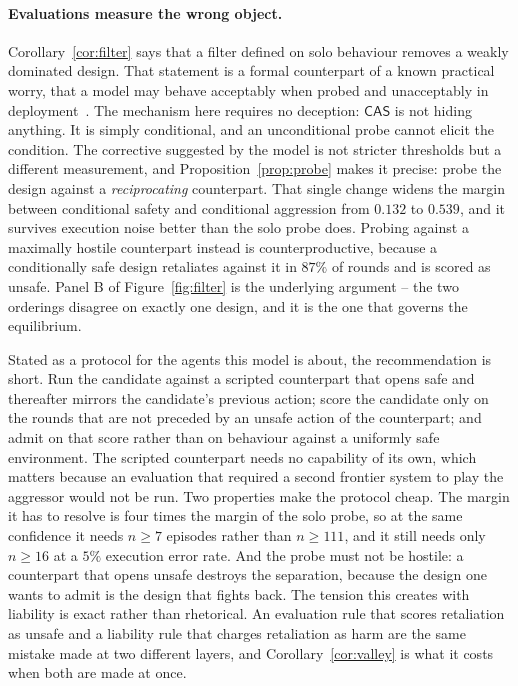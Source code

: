 \documentclass[11pt,a4paper]{article}
\theoremstyle{definition}
\newcommand{\CAS}{\textsf{CAS}}
\begin{document}
\paragraph{Evaluations measure the wrong object.}
Corollary~\ref{cor:filter} says that a filter defined on solo behaviour
removes a weakly dominated design. That statement is a formal counterpart of a
known practical worry, that a model may behave acceptably when probed and
unacceptably in deployment~\citep{vanderweij2024sandbagging,hammond2025multiagent}. The mechanism here
requires no deception: $\CAS$ is not hiding anything. It is simply
conditional, and an unconditional probe cannot elicit the condition. The
corrective suggested by the model is not stricter thresholds but a different
measurement, and Proposition~\ref{prop:probe} makes it precise: probe the
design against a \emph{reciprocating} counterpart. That single change widens
the margin between conditional safety and conditional aggression from $0.132$
to $0.539$, and it survives execution noise better than the solo probe does.
Probing against a maximally hostile counterpart instead is
counterproductive, because a conditionally safe design retaliates against it
in $87\%$ of rounds and is scored as unsafe. Panel B of
Figure~\ref{fig:filter} is the underlying argument -- the two orderings
disagree on exactly one design, and it is the one that governs the
equilibrium.

Stated as a protocol for the agents this model is about, the recommendation is
short. Run the candidate against a scripted counterpart that opens safe and
thereafter mirrors the candidate's previous action; score the candidate only
on the rounds that are not preceded by an unsafe action of the counterpart;
and admit on that score rather than on behaviour against a uniformly safe
environment. The scripted counterpart needs no capability of its own, which
matters because an evaluation that required a second frontier system to play
the aggressor would not be run. Two properties make the protocol cheap. The
margin it has to resolve is four times the margin of the solo probe, so at the
same confidence it needs $n\ge7$ episodes rather than $n\ge111$, and it still
needs only $n\ge16$ at a $5\%$ execution error rate. And the probe must not be
hostile: a counterpart that opens unsafe destroys the separation, because the
design one wants to admit is the design that fights back. The tension this
creates with liability is exact rather than rhetorical. An evaluation rule that
scores retaliation as unsafe and a liability rule that charges retaliation as
harm are the same mistake made at two different layers, and
Corollary~\ref{cor:valley} is what it costs when both are made at once.
\end{document}
